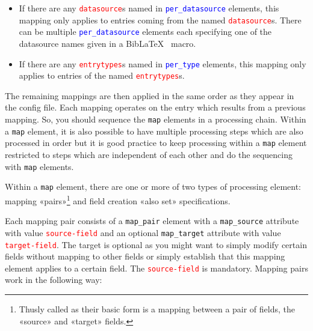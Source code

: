 \documentclass{ltxdockit}
\begin{document}
\begin{itemize}
\item If there are any \textcolor{red}{\texttt{datasource}}s named in
  \textcolor{blue}{\texttt{per\_datasource}} elements, this mapping only applies to entries
  coming from the named \textcolor{red}{\texttt{datasource}}s. There can be
  multiple \textcolor{blue}{\texttt{per\_datasource}} elements each specifying one of the
  datasource names given in a Bib\LaTeX\ \verb++ macro.
\item If there are any \textcolor{red}{\texttt{entrytypes}}s named in
  \textcolor{blue}{\texttt{per\_type}} elements, this mapping only applies to entries
  of the named \textcolor{red}{\texttt{entrytypes}}s.
\end{itemize}

\noindent The remaining mappings are then applied in the same order as
they appear in the config file. Each mapping operates on the entry
which results from a previous mapping. So, you should sequence the
\verb+map+ elements in a processing chain. Within a \verb+map+
element, it is also possible to have multiple processing steps which
are also processed in order but it is good practice to keep processing
within a \verb+map+ element restricted to steps which are independent
of each other and do the sequencing with \verb+map+ elements.

Within a \verb+map+ element, there are one or more of two types of
processing element: mapping
«pairs»\footnote{Thusly called as their basic form is a mapping
  between a pair of fields, the «source» and «target» fields.} and
field creation «also set» specifications.

Each mapping pair consists of a \verb+map_pair+ element with a
\verb+map_source+ attribute with value
\textcolor{red}{\texttt{source-field}} and an optional
\verb+map_target+ attribute with value
\textcolor{red}{\texttt{target-field}}. The target is optional as you
might want to simply modify certain fields without mapping to other
fields or simply establish that this mapping element applies to a
certain field.  The \textcolor{red}{\texttt{source-field}} is
mandatory. Mapping pairs work in the following way:\\
\end{document}
